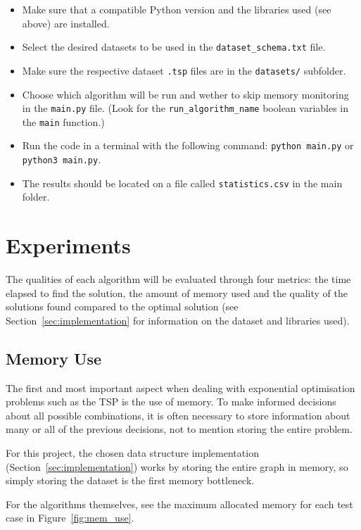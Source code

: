 \documentclass[12pt]{article}
\begin{document}
\begin{itemize}
  \item Make sure that a compatible Python version and the libraries used (see above) are installed.
  \item Select the desired datasets to be used in the \texttt{dataset\_schema.txt} file.
  \item Make sure the respective dataset \texttt{.tsp} files are in the \texttt{datasets/} subfolder.
  \item Choose which algorithm will be run and wether to skip memory monitoring in the \texttt{main.py} file. (Look for the \texttt{run\_algorithm\_name} boolean variables in the \texttt{main} function.)
  \item Run the code in a terminal with the following command: \texttt{python main.py} or \texttt{python3 main.py}.
  \item The results should be located on a file called \texttt{statistics.csv} in the main folder.
\end{itemize}

\section{Experiments} \label{sec:experiments}

The qualities of each algorithm will be evaluated through four metrics: the time elapsed 
to find the solution, the amount of memory used and the quality of the solutions found 
compared to the optimal solution (see Section~\ref{sec:implementation} for information 
on the dataset and libraries used).

\subsection{Memory Use} \label{sec:exp_memory}

The first and most important aspect when dealing with exponential optimisation problems such as 
the TSP is the use of memory. To make informed decisions about all possible combinations, 
it is often necessary to store information about many or all of the previous decisions, not to 
mention storing the entire problem.

For this project, the chosen data structure implementation (Section~\ref{sec:implementation}) works by storing 
the entire graph in memory, so simply storing the dataset is the first memory bottleneck.

For the algorithms themselves, see the maximum allocated memory for each test case in Figure~\ref{fig:mem_use}.
\end{document}
